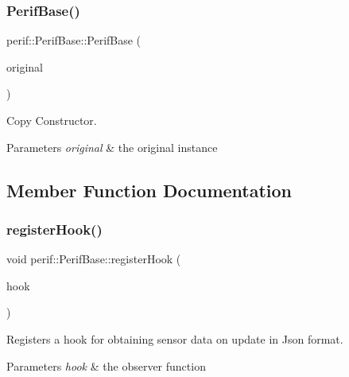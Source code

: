 \subsubsection{\texorpdfstring{PerifBase()}{PerifBase()}\hspace{0.1cm}{\footnotesize\ttfamily [2/2]}}
{\footnotesize\ttfamily perif\+::\+Perif\+Base\+::\+Perif\+Base (\begin{DoxyParamCaption}\item[{const \mbox{\hyperlink{classperif_1_1PerifBase}{Perif\+Base}} \&}]{original }\end{DoxyParamCaption})\hspace{0.3cm}{\ttfamily [default]}}

Copy Constructor.


\begin{DoxyParams}{Parameters}
{\em original} & the original instance \\
\hline
\end{DoxyParams}


\subsection{Member Function Documentation}
\mbox{\label{classperif_1_1PerifBase_a2e8bcc221ee253b21b61c7c07307d931}} 
\subsubsection{\texorpdfstring{registerHook()}{registerHook()}}
{\footnotesize\ttfamily void perif\+::\+Perif\+Base\+::register\+Hook (\begin{DoxyParamCaption}\item[{function$<$ void(\mbox{\hyperlink{Perif_8hpp_a358ff4ee6d24694ee7661f0cce14377e}{Dev\+Map}} \&)$>$ \&\&}]{hook }\end{DoxyParamCaption})\hspace{0.3cm}{\ttfamily [inline]}}

Registers a hook for obtaining sensor data on update in Json format.


\begin{DoxyParams}{Parameters}
{\em hook} & the observer function \\
\hline
\end{DoxyParams}



